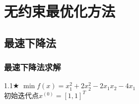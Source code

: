 \section{无约束最优化方法}

\subsection{最速下降法}

\subsubsection{最速下降法求解}

\begin{problem}{1.1$\bigstar$}
    $\min f(x)=x_1^2+2x_2^2-2x_1x_2-4x_1$\\
    初始迭代点${x^{(0)}}=[1,1]^T$
\end{problem}
